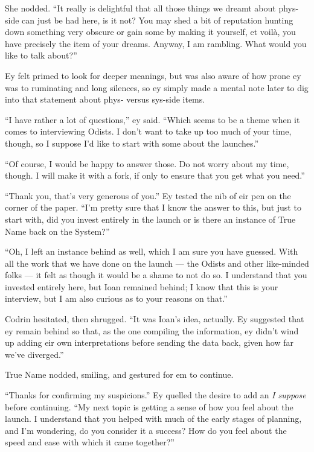 She nodded. ``It really is delightful that all those things we dreamt about phys-side can just be had here, is it not? You may shed a bit of reputation hunting down something very obscure or gain some by making it yourself, et voilà, you have precisely the item of your dreams. Anyway, I am rambling. What would you like to talk about?''

Ey felt primed to look for deeper meanings, but was also aware of how prone ey was to ruminating and long silences, so ey simply made a mental note later to dig into that statement about phys- versus sys-side items.

``I have rather a lot of questions,'' ey said. ``Which seems to be a theme when it comes to interviewing Odists. I don't want to take up too much of your time, though, so I suppose I'd like to start with some about the launches.''

``Of course, I would be happy to answer those. Do not worry about my time, though. I will make it with a fork, if only to ensure that you get what you need.''

``Thank you, that's very generous of you.'' Ey tested the nib of eir pen on the corner of the paper. ``I'm pretty sure that I know the answer to this, but just to start with, did you invest entirely in the launch or is there an instance of True Name back on the System?''

``Oh, I left an instance behind as well, which I am sure you have guessed. With all the work that we have done on the launch — the Odists and other like-minded folks — it felt as though it would be a shame to not do so. I understand that you invested entirely here, but Ioan remained behind; I know that this is your interview, but I am also curious as to your reasons on that.''

Codrin hesitated, then shrugged. ``It was Ioan's idea, actually. Ey suggested that ey remain behind so that, as the one compiling the information, ey didn't wind up adding eir own interpretations before sending the data back, given how far we've diverged.''

True Name nodded, smiling, and gestured for em to continue.

``Thanks for confirming my suspicions.'' Ey quelled the desire to add an \emph{I suppose} before continuing. ``My next topic is getting a sense of how you feel about the launch. I understand that you helped with much of the early stages of planning, and I'm wondering, do you consider it a success? How do you feel about the speed and ease with which it came together?''

